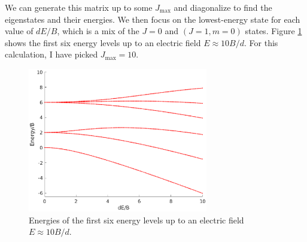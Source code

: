 \documentclass{article}
\theoremstyle{definition}
\begin{document}
We can generate this matrix up to some $J_\text{max}$ and diagonalize to find the eigenstates and their energies. We then focus on the lowest-energy state for each value of $dE/B$, which is a mix of the $J=0$ and $(J=1, m=0)$ states. Figure \ref{fig:energies} shows the first six energy levels up to an electric field $E \approx 10B/d$. For this calculation, I have picked $J_\text{max} = 10$.

\begin{figure}[!htb]
		\centering
		\includegraphics[width=0.7\textwidth]{energies.eps}
		\caption{Energies of the first six energy levels up to an electric field $E \approx 10 B/d$.}
		\label{fig:energies}
\end{figure}
\end{document}
